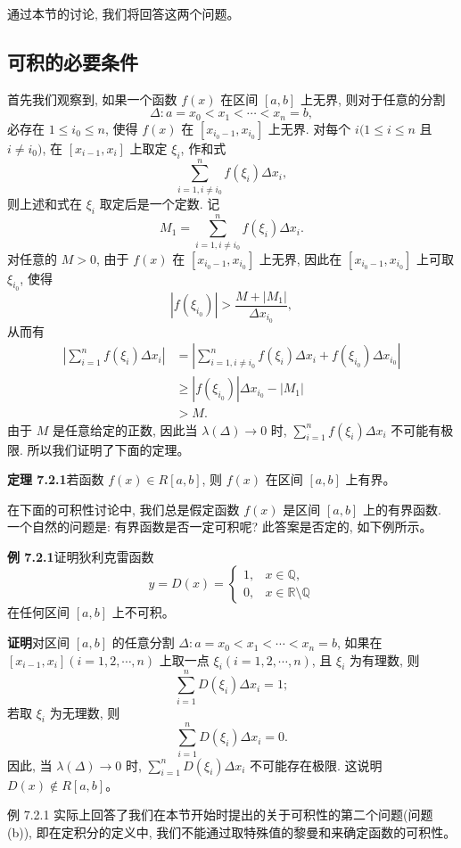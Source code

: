 \documentclass[UTF8, 12pt, fontset=fandol, oneside]{ctexart}
\begin{document}
通过本节的讨论, 我们将回答这两个问题。

\subsection{可积的必要条件}

首先我们观察到, 如果一个函数 $f(x)$ 在区间 $[a,b]$ 上无界, 则对于任意的分割
\[
  \Delta:a=x_0<x_1<\cdots<x_n=b,
\]
必存在 $1\leq i_0\leq n$, 使得 $f(x)$ 在 $[x_{i_0-1},x_{i_0}]$ 上无界. 对每个 $i(1\leq i\leq n$ 且 $i\ne i_0)$, 在 $[x_{i-1},x_i]$ 上取定 $\xi_i$, 作和式
\[
  \sum_{i=1,i\ne i_0}^n f(\xi_i)\Delta x_i,
\]
则上述和式在 $\xi_i$ 取定后是一个定数. 记
\[
  M_1=\sum_{i=1,i\ne i_0}^n f(\xi_i)\Delta x_i.
\]
对任意的 $M>0$, 由于 $f(x)$ 在 $[x_{i_0-1},x_{i_0}]$ 上无界, 因此在 $[x_{i_0-1},x_{i_0}]$ 上可取 $\xi_{i_0}$, 使得
\[
  |f(\xi_{i_0})|>\frac{M+|M_1|}{\Delta x_{i_0}},
\]
从而有
\[
\begin{aligned}
  \left|\sum_{i=1}^n f(\xi_i)\Delta x_i\right|
  &=\left|\sum_{i=1,i\ne i_0}^n f(\xi_i)\Delta x_i+f(\xi_{i_0})\Delta x_{i_0}\right|\\
  &\geq |f(\xi_{i_0})|\Delta x_{i_0}-|M_1|\\
  &>M.
\end{aligned}
\]
由于 $M$ 是任意给定的正数, 因此当 $\lambda(\Delta)\to0$ 时, $\sum\limits_{i=1}^n f(\xi_i)\Delta x_i$ 不可能有极限. 所以我们证明了下面的定理。

\noindent\textbf{定理 7.2.1}\quad 若函数 $f(x)\in R[a,b]$, 则 $f(x)$ 在区间 $[a,b]$ 上有界。

在下面的可积性讨论中, 我们总是假定函数 $f(x)$ 是区间 $[a,b]$ 上的有界函数. 一个自然的问题是: 有界函数是否一定可积呢? 此答案是否定的, 如下例所示。

\noindent\textbf{例 7.2.1}\quad 证明狄利克雷函数
\[
  y=D(x)=
  \begin{cases}
    1, & x\in\mathbb Q,\\
    0, & x\in\mathbb R\setminus\mathbb Q
  \end{cases}
\]
在任何区间 $[a,b]$ 上不可积。

\noindent\textbf{证明}\quad 对区间 $[a,b]$ 的任意分割 $\Delta:a=x_0<x_1<\cdots<x_n=b$, 如果在 $[x_{i-1},x_i](i=1,2,\cdots,n)$ 上取一点 $\xi_i(i=1,2,\cdots,n)$, 且 $\xi_i$ 为有理数, 则
\[
  \sum_{i=1}^n D(\xi_i)\Delta x_i=1;
\]
若取 $\xi_i$ 为无理数, 则
\[
  \sum_{i=1}^n D(\xi_i)\Delta x_i=0.
\]
因此, 当 $\lambda(\Delta)\to0$ 时, $\sum\limits_{i=1}^n D(\xi_i)\Delta x_i$ 不可能存在极限. 这说明 $D(x)\notin R[a,b]$。

例 7.2.1 实际上回答了我们在本节开始时提出的关于可积性的第二个问题(问题 (b)), 即在定积分的定义中, 我们不能通过取特殊值的黎曼和来确定函数的可积性。
\end{document}
